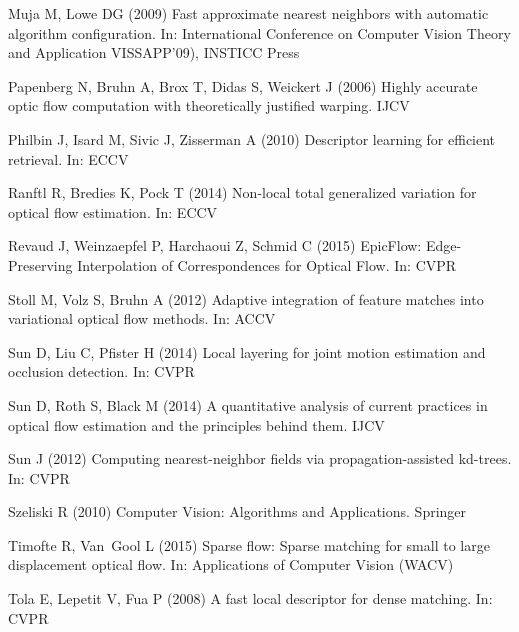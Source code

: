 \documentclass[twocolumn,natbib]{svjour3}
\begin{document}
\begin{thebibliography}{57}
Muja M, Lowe DG (2009) Fast approximate nearest neighbors with automatic
  algorithm configuration. In: International Conference on Computer Vision
  Theory and Application VISSAPP'09), INSTICC Press

Papenberg N, Bruhn A, Brox T, Didas S, Weickert J (2006) Highly accurate optic
  flow computation with theoretically justified warping. IJCV

Philbin J, Isard M, Sivic J, Zisserman A (2010) Descriptor learning for
  efficient retrieval. In: ECCV

Ranftl R, Bredies K, Pock T (2014) Non-local total generalized variation for
  optical flow estimation. In: ECCV

Revaud J, Weinzaepfel P, Harchaoui Z, Schmid C (2015) {EpicFlow:
  Edge-Preserving Interpolation of Correspondences for Optical Flow}. In:
  {CVPR}

Stoll M, Volz S, Bruhn A (2012) Adaptive integration of feature matches into
  variational optical flow methods. In: ACCV

Sun D, Liu C, Pfister H (2014{}) Local layering for joint motion
  estimation and occlusion detection. In: CVPR

Sun D, Roth S, Black M (2014{}) A quantitative analysis of current
  practices in optical flow estimation and the principles behind them. IJCV

Sun J (2012) Computing nearest-neighbor fields via propagation-assisted
  kd-trees. In: CVPR

Szeliski R (2010) Computer Vision: Algorithms and Applications. Springer

Timofte R, Van~Gool L (2015) Sparse flow: Sparse matching for small to large
  displacement optical flow. In: Applications of Computer Vision (WACV)

Tola E, Lepetit V, Fua P (2008) A fast local descriptor for dense matching. In:
  CVPR


\end{thebibliography}
\end{document}
